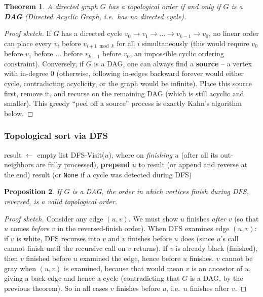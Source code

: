 \documentclass[11pt]{article}
\newtheorem{theorem}{Theorem}[section]
\newtheorem{proposition}[theorem]{Proposition}
\begin{document}
\begin{theorem}
\label{thm:dag-toposort}
A directed graph $G$ has a topological order if and only if $G$ is a \textbf{DAG}
(Directed Acyclic Graph, i.e.\ has no directed cycle).
\end{theorem}
\begin{proof}[Proof sketch]
If $G$ has a directed cycle $v_0 \to v_1 \to \dots \to v_{k-1} \to v_0$, no linear order
can place every $v_i$ before $v_{i+1 \bmod k}$ for all $i$ simultaneously (this would
require $v_0$ before $v_1$ before $\dots$ before $v_{k-1}$ before $v_0$, an impossible
cyclic ordering constraint). Conversely, if $G$ is a DAG, one can always find a
\textbf{source} -- a vertex with in-degree 0 (otherwise, following in-edges backward
forever would either cycle, contradicting acyclicity, or the graph would be infinite).
Place this source first, remove it, and recurse on the remaining DAG (which is still
acyclic and smaller). This greedy ``peel off a source'' process is exactly Kahn's
algorithm below.
\end{proof}

\subsubsection{Topological sort via DFS}

\begin{algorithm}[h]
\caption{Topological-Sort-DFS$(adj)$}
\begin{algorithmic}[1]
\State result $\gets$ empty list
    \State DFS-Visit($u$), where on \emph{finishing} $u$ (after all its out-neighbors are
    fully processed), \textbf{prepend} $u$ to result (or append and reverse at the end)
\EndFor
\State \Return result (or \texttt{None} if a cycle was detected during DFS)
\end{algorithmic}
\end{algorithm}

\begin{proposition}
If $G$ is a DAG, the order in which vertices \emph{finish} during DFS, reversed, is a
valid topological order.
\end{proposition}
\begin{proof}[Proof sketch]
Consider any edge $(u,v)$. We must show $u$ finishes \emph{after} $v$ (so that $u$ comes
\emph{before} $v$ in the reversed-finish order). When DFS examines edge $(u,v)$: if $v$ is
white, DFS recurses into $v$ and $v$ finishes before $u$ does (since $u$'s call cannot
finish until the recursive call on $v$ returns). If $v$ is already black (finished), then
$v$ finished before $u$ examined the edge, hence before $u$ finishes. $v$ cannot be gray
when $(u,v)$ is examined, because that would mean $v$ is an ancestor of $u$, giving a back
edge and hence a cycle (contradicting that $G$ is a DAG, by the previous theorem). So in
all cases $v$ finishes before $u$, i.e.\ $u$ finishes after $v$.
\end{proof}
\end{document}
